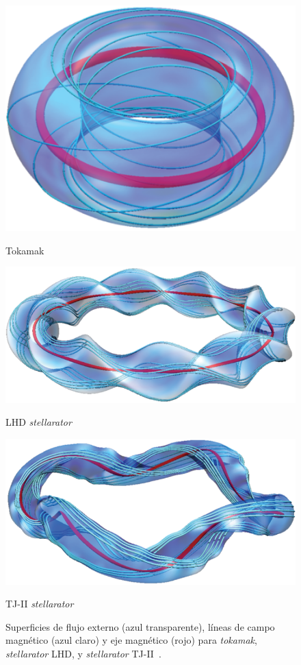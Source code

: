 \begin{figure}[H]
    \centering
            \includegraphics[width=\linewidth]{img/twist_1.png}
            \caption*{Tokamak}
        \endminipage\hfill
            \includegraphics[width=\linewidth]{img/twist_2.png}
            \caption*{LHD \textit{stellarator}}
        \endminipage\hfill
            \includegraphics[width=\linewidth]{img/twist_3.png}
            \caption*{TJ-II \textit{stellarator}}
        \endminipage
    \caption[Superficies de flujo externo, líneas de campo magnético y eje magnético para \textit{tokamak}, \textit{stellarator} LHD, y \textit{stellarator} TJ-II]{Superficies de flujo externo (azul transparente), líneas de campo magnético (azul claro) y eje magnético
    (rojo) para \textit{tokamak}, \textit{stellarator} LHD, y \textit{stellarator} TJ-II~\cite{doi:10.1063/1.4921255}.}
    \label{fig:twist}
\end{figure}
